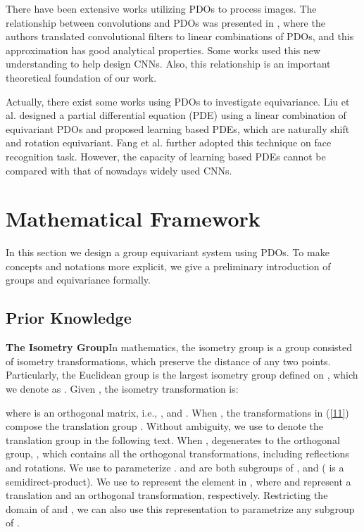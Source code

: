 \documentclass{article}
\begin{document}
There have been extensive works \cite{jain1978partial,witkin1987scale-space,koenderink1984the,perona1990scale-space,osher1990feature-oriented} utilizing PDOs to process images. The relationship between convolutions and PDOs was presented in \cite{dong2017image,ruthotto2018deep}, where the authors translated convolutional filters to linear combinations of PDOs, and this approximation has good analytical properties. Some works \cite{long2018pde,long2019pde} used this new understanding to help design CNNs. Also, this relationship is an important theoretical foundation of our work.

Actually, there exist some works using PDOs to investigate equivariance. Liu et al.  designed a partial differential equation (PDE) using a linear combination of equivariant PDOs and proposed learning based PDEs, which are naturally shift and rotation equivariant. Fang et al.  further adopted this technique on face recognition task. However, the capacity of learning based PDEs cannot be compared with that of nowadays widely used CNNs.


\section{Mathematical Framework}
In this section we design a group equivariant system using PDOs. To make concepts and notations more explicit, we give a preliminary introduction of groups and equivariance formally. 

\subsection{Prior Knowledge}
\textbf{The Isometry Group}\quad In mathematics, the isometry group is a group consisted of isometry transformations, which preserve the distance of any two points. Particularly, the Euclidean group is the largest isometry group defined on , which we denote as . Given , the isometry transformation is:

where  is an orthogonal matrix, i.e., , and . When , the transformations in (\ref{11}) compose the translation group . Without ambiguity, we use  to denote the translation group in the following text. When ,  degenerates to the orthogonal group, , which contains all the orthogonal transformations, including reflections and rotations. We use  to parameterize .  and  are both subgroups of , 
and   ( is a semidirect-product). We use  to represent the element in , where  and  represent a translation and an orthogonal transformation, respectively. Restricting the domain of  and , we can also use this representation to parametrize any subgroup of . 
\end{document}
